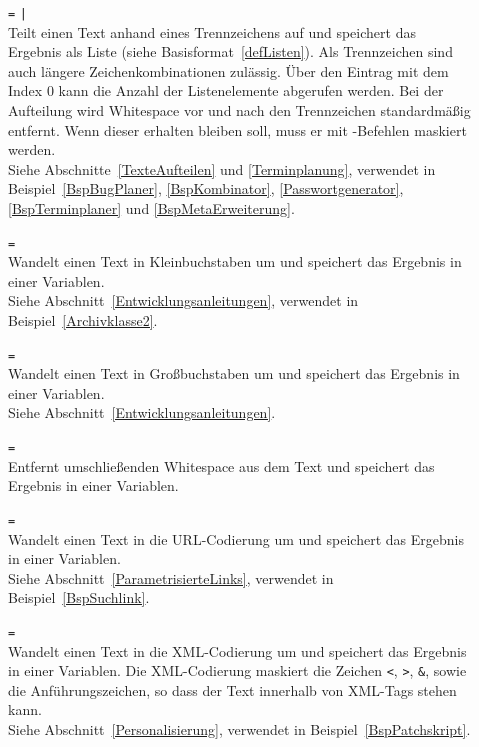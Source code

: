 \begin{description}
\item[]  \verb|=|  \verb=|= \\
Teilt einen Text anhand eines Trennzeichens auf und speichert das Ergebnis als Liste (siehe Basisformat~\ref{defListen}). Als Trennzeichen sind auch längere Zeichenkombinationen zulässig.
Über den Eintrag mit dem Index 0 kann die Anzahl der Listenelemente abgerufen werden. Bei der Aufteilung wird Whitespace vor und nach den Trennzeichen standardmäßig entfernt. Wenn dieser erhalten bleiben soll, muss er mit -Befehlen maskiert werden.\\
Siehe Abschnitte~\ref{TexteAufteilen} und \ref{Terminplanung}, verwendet in Beispiel~\ref{BspBugPlaner}, \ref{BspKombinator}, \ref{Passwortgenerator}, \ref{BspTerminplaner} und \ref{BspMetaErweiterung}.

\item[]  \verb|=| \\
Wandelt einen Text in Kleinbuchstaben um und speichert das Ergebnis in einer Variablen.\\
Siehe Abschnitt~\ref{Entwicklungsanleitungen}, verwendet in Beispiel~\ref{Archivklasse2}.

\item[]  \verb|=| \\
Wandelt einen Text in Großbuchstaben um und speichert das Ergebnis in einer Variablen.\\
Siehe Abschnitt~\ref{Entwicklungsanleitungen}.

\item[]  \verb|=| \\
Entfernt umschließenden Whitespace aus dem Text und speichert das Ergebnis in einer Variablen.

\item[]  \verb|=| \\
Wandelt einen Text in die URL-Codierung um und speichert das Ergebnis in einer Variablen.\\
Siehe Abschnitt~\ref{ParametrisierteLinks}, verwendet in Beispiel~\ref{BspSuchlink}.

\item[]  \verb|=| \\
Wandelt einen Text in die XML-Codierung um und speichert das Ergebnis in einer Variablen. Die XML-Codierung maskiert die Zeichen \verb|<|, \verb|>|, \verb|&|, sowie die Anführungszeichen, so dass der Text innerhalb von XML-Tags stehen kann.\\
Siehe Abschnitt~\ref{Personalisierung}, verwendet in Beispiel~\ref{BspPatchskript}.
\end{description}